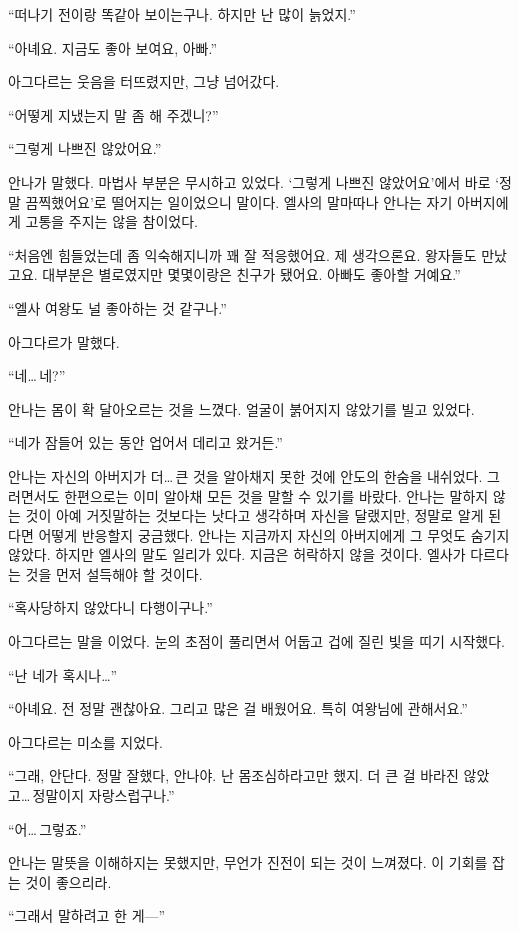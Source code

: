 ``떠나기 전이랑 똑같아 보이는구나. 하지만 난 많이 늙었지.''

``아녜요. 지금도 좋아 보여요, 아빠.''

아그다르는 웃음을 터뜨렸지만, 그냥 넘어갔다.

``어떻게 지냈는지 말 좀 해 주겠니?''

``그렇게 나쁘진 않았어요.''

안나가 말했다. 마법사 부분은 무시하고 있었다. `그렇게 나쁘진 않았어요'에서 바로 `정말 끔찍했어요'로 떨어지는 일이었으니 말이다. 엘사의 말마따나 안나는 자기 아버지에게 고통을 주지는 않을 참이었다.

``처음엔 힘들었는데 좀 익숙해지니까 꽤 잘 적응했어요. 제 생각으론요. 왕자들도 만났고요. 대부분은 별로였지만 몇몇이랑은 친구가 됐어요. 아빠도 좋아할 거예요.''

``엘사 여왕도 널 좋아하는 것 같구나.''

아그다르가 말했다.

``네\ldots\,네?''

안나는 몸이 확 달아오르는 것을 느꼈다. 얼굴이 붉어지지 않았기를 빌고 있었다.

``네가 잠들어 있는 동안 업어서 데리고 왔거든.''

안나는 자신의 아버지가 더\ldots\,큰 것을 알아채지 못한 것에 안도의 한숨을 내쉬었다. 그러면서도 한편으로는 이미 알아채 모든 것을 말할 수 있기를 바랐다. 안나는 말하지 않는 것이 아예 거짓말하는 것보다는 낫다고 생각하며 자신을 달랬지만, 정말로 알게 된다면 어떻게 반응할지 궁금했다. 안나는 지금까지 자신의 아버지에게 그 무엇도 숨기지 않았다. 하지만 엘사의 말도 일리가 있다. 지금은 허락하지 않을 것이다. 엘사가 다르다는 것을 먼저 설득해야 할 것이다.

``혹사당하지 않았다니 다행이구나.''

아그다르는 말을 이었다. 눈의 초점이 풀리면서 어둡고 겁에 질린 빛을 띠기 시작했다.

``난 네가 혹시나\ldots''

``아녜요. 전 정말 괜찮아요. 그리고 많은 걸 배웠어요. 특히 여왕님에 관해서요.''

아그다르는 미소를 지었다.

``그래, 안단다. 정말 잘했다, 안나야. 난 몸조심하라고만 했지. 더 큰 걸 바라진 않았고\ldots\,정말이지 자랑스럽구나.''

``어\ldots\,그렇죠.''

안나는 말뜻을 이해하지는 못했지만, 무언가 진전이 되는 것이 느껴졌다. 이 기회를 잡는 것이 좋으리라.

``그래서 말하려고 한 게—''

